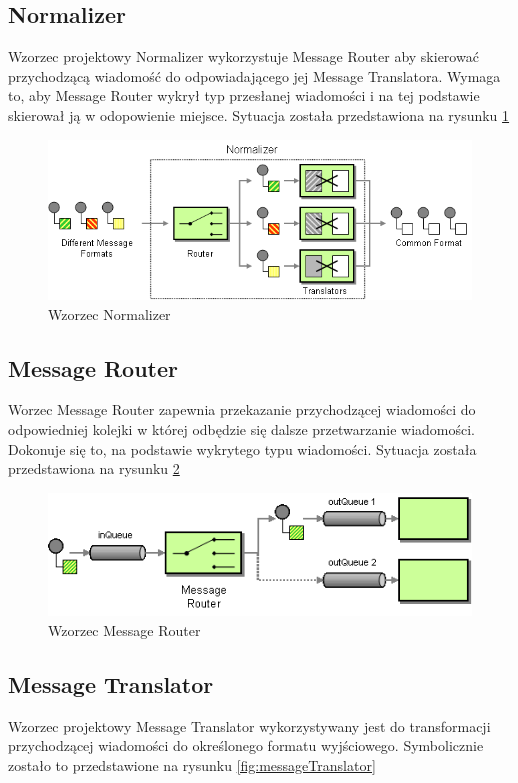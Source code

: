 \subsection{Normalizer}
Wzorzec projektowy Normalizer wykorzystuje Message Router aby skierować przychodzącą wiadomość do odpowiadającego jej Message Translatora.
Wymaga to, aby Message Router wykrył typ przesłanej wiadomości i na tej podstawie skierował ją w odopowienie miejsce.
Sytuacja została przedstawiona na rysunku \ref{fig:normalizer}

\begin{figure}[!h]
 \centering
 \includegraphics[width=1.0\textwidth]{eip/Normalizer}
 \caption{Wzorzec Normalizer}
 \label{fig:normalizer}
\end{figure}

\subsection{Message Router}
Worzec Message Router zapewnia przekazanie przychodzącej wiadomości do odpowiedniej kolejki w której odbędzie się dalsze przetwarzanie wiadomości.
Dokonuje się to, na podstawie wykrytego typu wiadomości.
Sytuacja została przedstawiona na rysunku \ref{fig:messageRouter}

\begin{figure}[!h]
 \centering
 \includegraphics[width=1.0\textwidth]{eip/MessageRouter}
 \caption{Wzorzec Message Router}
 \label{fig:messageRouter}
\end{figure}

\subsection{Message Translator}
Wzorzec projektowy Message Translator wykorzystywany jest do transformacji przychodzącej wiadomości do określonego formatu wyjściowego.
Symbolicznie zostało to przedstawione na rysunku \ref{fig:messageTranslator}

